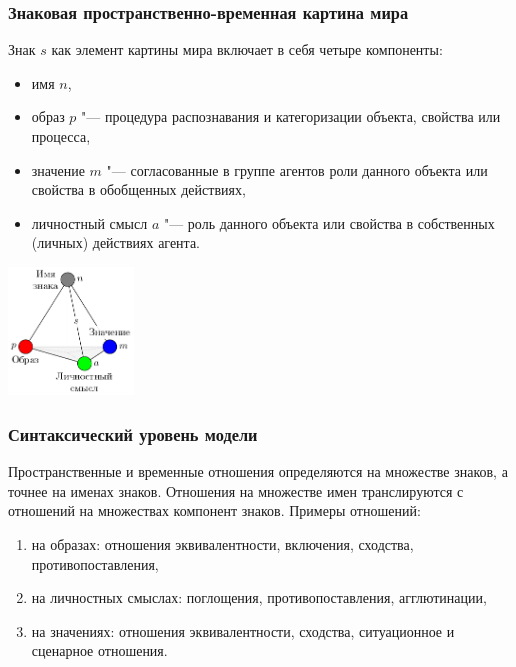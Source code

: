 \documentclass[default]{beamer}
\begin{document}
	\begin{frame}
		\frametitle{Знаковая пространственно-временная картина мира}

		Знак $s$ как элемент картины мира включает в себя четыре компоненты:
		\begin{itemize}
			\item имя $n$,
			\item образ $p$ "--- процедура распознавания и категоризации объекта, свойства или процесса,
			\item значение $m$ "--- согласованные в группе агентов роли данного объекта или свойства в обобщенных действиях,
			\item личностный смысл $a$  "--- роль данного объекта или свойства в собственных (личных) действиях агента.
		\end{itemize}
		\begin{center}
			\includegraphics[width=0.25\textwidth]{signs/sign_colored}
		\end{center}
	\end{frame}

	\begin{frame}
		\frametitle{Синтаксический уровень модели}
		
		Пространственные и временные отношения определяются на множестве знаков, а точнее на именах знаков. Отношения на множестве имен транслируются с отношений на множествах компонент знаков. Примеры отношений:
		
		\begin{enumerate}
			\item на образах: отношения эквивалентности, включения, сходства, противопоставления,
			\item на личностных смыслах: поглощения, противопоставления, агглютинации,
			\item на значениях: отношения эквивалентности, сходства, ситуационное и сценарное отношения.
		\end{enumerate}
		
	\end{frame}
\end{document}
